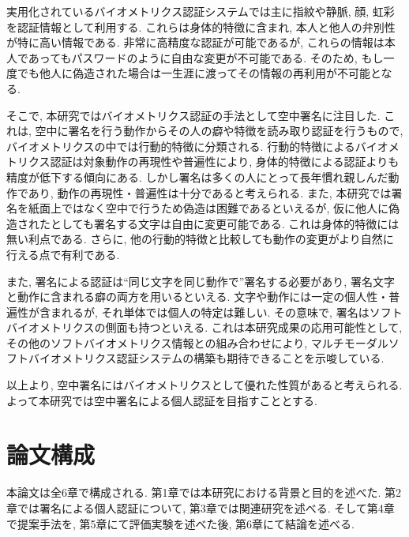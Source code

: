 実用化されているバイオメトリクス認証システムでは主に指紋や静脈, 顔, 虹彩を認証情報として利用する\cite{cite_1}. これらは身体的特徴に含まれ, 本人と他人の弁別性が特に高い情報である. 非常に高精度な認証が可能であるが, これらの情報は本人であってもパスワードのように自由な変更が不可能である. そのため, もし一度でも他人に偽造された場合は一生涯に渡ってその情報の再利用が不可能となる. 

そこで, 本研究ではバイオメトリクス認証の手法として空中署名に注目した. これは, 空中に署名を行う動作からその人の癖や特徴を読み取り認証を行うもので, バイオメトリクスの中では行動的特徴に分類される. 行動的特徴によるバイオメトリクス認証は対象動作の再現性や普遍性により, 身体的特徴による認証よりも精度が低下する傾向にある. しかし署名は多くの人にとって長年慣れ親しんだ動作であり, 動作の再現性・普遍性は十分であると考えられる. また, 本研究では署名を紙面上ではなく空中で行うため偽造は困難であるといえるが, 仮に他人に偽造されたとしても署名する文字は自由に変更可能である. これは身体的特徴には無い利点である. さらに, 他の行動的特徴と比較しても動作の変更がより自然に行える点で有利である.

また, 署名による認証は“同じ文字を同じ動作で”署名する必要があり, 署名文字と動作に含まれる癖の両方を用いるといえる. 文字や動作には一定の個人性・普遍性が含まれるが, それ単体では個人の特定は難しい. その意味で, 署名はソフトバイオメトリクスの側面も持つといえる. これは本研究成果の応用可能性として, その他のソフトバイオメトリクス情報との組み合わせにより, マルチモーダルソフトバイオメトリクス認証システムの構築も期待できることを示唆している.

以上より, 空中署名にはバイオメトリクスとして優れた性質があると考えられる. よって本研究では空中署名による個人認証を目指すこととする.

\newpage
\section{論文構成}
本論文は全6章で構成される. 第1章では本研究における背景と目的を述べた. 第2章では署名による個人認証について, 第3章では関連研究を述べる. そして第4章で提案手法を, 第5章にて評価実験を述べた後, 第6章にて結論を述べる.
